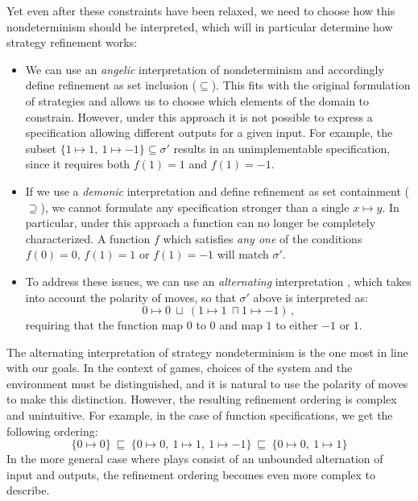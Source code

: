 \documentclass[11pt,oneside]{book}
\theoremstyle{definition}
\begin{document}
Yet even after these constraints have been relaxed,
we need to choose how
this nondeterminism should be interpreted,
which will in particular determine
how strategy refinement works:
\begin{itemize}
  \item We can use an \emph{angelic} interpretation of nondeterminism
    and accordingly define refinement as set inclusion ($\subseteq$).
    This fits with the original formulation of strategies
    and allows us to choose
    which elements of the domain to constrain.
    However, under this approach it is not possible
    to express a specification
    allowing different outputs for a given input.
    For example, the subset
    $\{ 1 \mapsto 1, \: 1 \mapsto -1 \} \subseteq \sigma'$
    results in an unimplementable specification,
    since it requires both
    $f(1) = 1$ and $f(1) = -1$.
  \item If we use a \emph{demonic} interpretation
    and define refinement as set containment ($\supseteq$),
    we cannot formulate any specification
    stronger than a single $x \mapsto y$.
    In particular, under this approach a function can no longer be
    completely characterized.
    A function $f$
    which satisfies \emph{any one} of the conditions
    $f(0) = 0$, $f(1) = 1$ or $f(1) = -1$ will
    match $\sigma'$.
  \item
    To address these issues,
    we can use an \emph{alternating} interpretation
    \citep{altref},
    which takes into account the polarity of moves,
    so that $\sigma'$ above is interpreted as:
    \[
      0 \mapsto 0 \: \sqcup \:
      (1 \mapsto 1 \: \sqcap 1 \mapsto -1)
      \,,
    \]
    requiring that the function
    map $0$ to $0$ and
    map $1$ to either $-1$ or $1$.
\end{itemize}

The alternating interpretation of strategy nondeterminism
is the one most in line with our goals.
In the context of games,
choices of the system and the environment must be distinguished,
and it is natural to use the polarity of moves
to make this distinction.
However,
the resulting refinement ordering
is complex and unintuitive.
For example,
in the case of function specifications,
we get the following ordering:
\[
  \{ 0 \mapsto 0 \}
  \: \sqsubseteq \:
  \{ 0 \mapsto 0, \: 1 \mapsto 1, \: 1 \mapsto -1 \}
  \: \sqsubseteq \:
  \{ 0 \mapsto 0, \: 1 \mapsto 1 \}
\]
In the more general case where plays consist of
an unbounded alternation of input and outputs,
the refinement ordering becomes even more
complex to describe.
\end{document}
